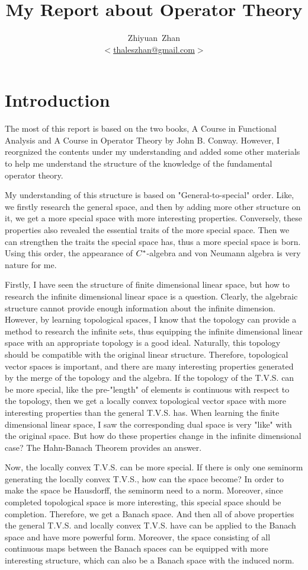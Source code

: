 \documentclass[a4paper,11pt]{report}
\title{My Report about Operator Theory}
\author{Zhiyuan~Zhan\\ $<$\href{mailto:thaleszhan@gmail.com}%
            {thaleszhan@gmail.com}$>$}
\begin{document}
\maketitle
\tableofcontents

\chapter{Introduction}

The most of this report is based on the two books, A Course in Functional Analysis and A Course in Operator Theory by John B. Conway. However, I reorgnized the contents under my understanding and added some other materials to help me understand the structure of the knowledge of the fundamental operator theory.

 My understanding of this structure is based on "General-to-special" order. Like, we firstly research the general space, and then by adding more other structure on it, we get a more special space with more interesting properties. Conversely, these properties also revealed the essential traits of the more special space. Then we can strengthen the traits the special space has, thus a more special space is born. Using this order, the appearance of $C^{*}$-algebra and von Neumann algebra is very nature for me.

 Firstly, I have seen the structure of finite dimensional linear space, but how to research the infinite dimensional linear space is a question. Clearly, the algebraic structure cannot provide enough information about the infinite dimension. However, by learning topological spaces, I know that the topology can provide a method to research the infinite sets, thus equipping the infinite dimensional linear space with an appropriate topology is a good ideal. Naturally, this topology should be compatible with the original linear structure. Therefore, topological vector spaces is important, and there are many interesting properties generated by the merge of the topology and the algebra. If the topology of the T.V.S. can be more special, like the pre-"length" of elements is continuous with respect to the topology, then we get a locally convex topological vector space with more interesting properties than the general T.V.S. has. When learning the finite dimensional linear space, I saw the corresponding dual space is very "like" with the original space. But how do these properties change in the infinite dimensional case? The Hahn-Banach Theorem provides an answer.

 Now, the locally convex T.V.S. can be more special. If there is only one seminorm generating the locally convex T.V.S., how can the space become? In order to make the space be Hausdorff, the seminorm need to a norm. Moreover, since completed topological space is more interesting, this special space should be completion. Therefore, we get a Banach space. And then all of above properties the general T.V.S. and locally convex T.V.S. have can be applied to the Banach space and have more powerful form. Moreover, the space consisting of all continuous maps between the Banach spaces can be equipped with more interesting structure, which can also be a Banach space with the induced norm.
\end{document}

